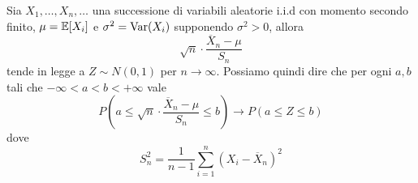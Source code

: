 \begin{proposition}
	Sia $X_1, \dots, X_n, \dots$ una successione di variabili aleatorie i.i.d con momento secondo
	finito, $\mu = \mathbb{E}[X_i]$ e $\sigma^2 = \operatorname{Var}(X_i)$ supponendo $\sigma^2 > 0$, allora
	\[ \sqrt{n} \cdot \frac{\overline{X}_n  - \mu}{S_n} \]
	tende in legge a $Z \sim N(0,1)$ per $n \to \infty$. Possiamo quindi dire che per ogni $a,b$
	tali che $-\infty < a < b < +\infty$ vale
	\[
		P \left( a \leq \sqrt{n} \cdot \frac{\overline{X}_n  - \mu}{S_n} \leq b \right) \to
		P(a \leq Z \leq b)
	\]
	dove
	\[ S_n^2 = \frac{1}{n-1} \sum_{i=1}^{n} (X_i - \overline{X}_n)^2 \]
\end{proposition}